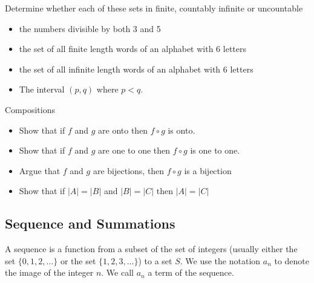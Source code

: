 \newpage
\begin{exmp}
Determine whether each of these sets in finite, countably infinite or uncountable
\begin{itemize}
\item the numbers divisible by both 3 and 5
\vspace{1cm}
\item the set of all finite length words of an alphabet with 6 letters
\vspace{1cm}
\item the set of all infinite length words of an alphabet with 6 letters
\vspace{1cm}
\item The interval $(p,q)$ where $p<q$.
\end{itemize}
\end{exmp}
\newpage
\begin{exmp}{Compositions}
\begin{itemize}
\item Show that if $f$ and $g$ are onto then $f \circ g$ is onto. 
\vspace{3cm}
\item Show that if $f$ and $g$ are one to one then $f \circ g$ is one to one. 
\vspace{3cm}
\item Argue that $f$ and $g$ are bijections, then $f \circ g$ is a bijection
\vspace{1cm}
\item Show that if $|A|=|B|$ and $|B|=|C|$ then $|A|=|C|$
\vspace{3cm}
\end{itemize}
\end{exmp}

\newpage

\subsection{Sequence and Summations}
\begin{defn}[sequence]
A sequence is a function from a subset of the set of integers (usually either the set $\{0, 1, 2, \ldots\}$ or the set $\{1, 2, 3, \ldots\}$) to a set $S$. We use the notation $a_n$ to denote the image of the integer $n$. We call $a_n$ a term of the sequence.
\end{defn}

